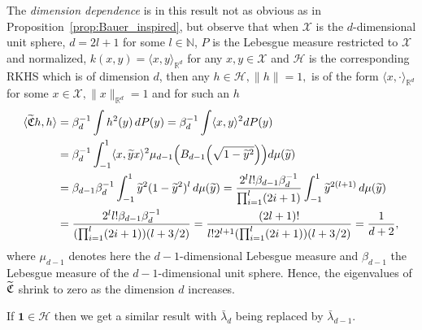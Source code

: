 \documentclass[AHL,Unicode,longabstracts,published]{cedram}
\theoremstyle{remark}
\newcommand{\R}{\mathbb{R}}
\newcommand{\bbN}{\mathbb{N}}
\newcommand{\X}{\mathcal{X}}
\newcommand{\cH}{\mathcal{H}}
\newcommand{\fkC}{\mathfrak{C}}
\let\oldtilde\tilde
\renewcommand*{\tilde}[1]{\mathchoice{\widetilde{#1}}{\widetilde{#1}}{\oldtilde{#1}}{\oldtilde{#1}}}
\let\originalleft\left
\let\originalright\right
\renewcommand{\left}{\mathopen{}\mathclose\bgroup\originalleft}
\renewcommand{\right}{\aftergroup\egroup\originalright}
\begin{document}
The \emph{dimension dependence} is in this result not as obvious as in Proposition~\ref{prop:Bauer_inspired}, but observe that when $\X$ is the $d$-dimensional unit sphere, $d =2l +1$ for some $l \in \bbN$, $P$ is the Lebesgue measure restricted to $\X$ and normalized, $k(x,y) = \langle x,y \rangle_{\R^d}$ for any $x,y \in \X$ and $\cH$ is the corresponding RKHS which is of dimension $d$, then any $h \in \cH, \|h\|=1,$ is of the form $\langle x,\cdot \rangle_{\R^d}$ for some $x\in \X,\|x\|_{\R^d}=1$ and for such an $h$
\begin{align*}
\langle \tilde{\fkC} h,h \rangle &= \beta_d^{-1} \int h^2(y) \,dP(y)= \beta_d^{-1} \int \langle x,y\rangle^2  dP(y) \\
&= \beta_d^{-1} \int_{-1}^1 \langle x,\tilde yx\rangle^2 \mu_{d-1}\left(B_{d-1}\left(\sqrt{1-\tilde y^2}\right)\right) d \mu(\tilde y) \\
&= \beta_{d-1}\beta_d^{-1} \int_{-1}^1 \tilde y^2 (1-\tilde y^2)^{l} \,d\mu(\tilde y) =\frac{2^ll! \beta_{d-1}\beta_d^{-1}} {\prod_{i=1}^l (2i +1)}\int_{-1}^1 \tilde y^{2(l+1)} \,d\mu(\tilde y) \\
&= \frac{2^ll! \beta_{d-1}\beta_d^{-1}}{(\prod_{i=1}^l (2i +1))(l+ 3/2)} = \frac{(2l+1)!}{l! 2^{l+1}(\prod_{i=1}^l (2i +1))(l+ 3/2)} = \frac{1}{d+ 2},
\end{align*}
where $\mu_{d-1}$ denotes here the $d-1$-dimensional Lebesgue measure and $\beta_{d-1}$ the Lebesgue measure of the $d-1$-dimensional unit sphere. Hence, the eigenvalues of $\tilde{\fkC}$ shrink to zero as the dimension $d$ increases.

If $\bm 1 \in \cH$ then we get a similar result with $\bar \lambda_d$ being replaced by $\bar \lambda_{d-1}$.
\end{document}
